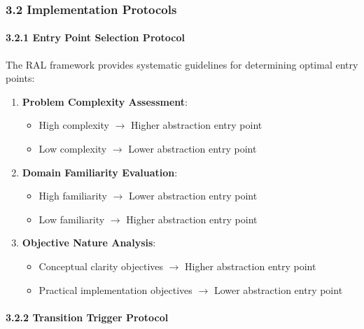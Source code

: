 \documentclass[
]{article}
\providecommand{\tightlist}{%
  \setlength{\itemsep}{0pt}\setlength{\parskip}{0pt}}
\begin{document}
\subsubsection{3.2 Implementation
Protocols}\label{implementation-protocols}

\paragraph{3.2.1 Entry Point Selection
Protocol}\label{entry-point-selection-protocol}

The RAL framework provides systematic guidelines for determining optimal
entry points:

\begin{enumerate}
\def\labelenumi{\arabic{enumi}.}
\tightlist
\item
  \textbf{Problem Complexity Assessment}:

  \begin{itemize}
  \tightlist
  \item
    High complexity \(\to \) Higher abstraction entry point
  \item
    Low complexity \(\to \) Lower abstraction entry point
  \end{itemize}
\item
  \textbf{Domain Familiarity Evaluation}:

  \begin{itemize}
  \tightlist
  \item
    High familiarity \(\to \) Lower abstraction entry point
  \item
    Low familiarity \(\to \) Higher abstraction entry point
  \end{itemize}
\item
  \textbf{Objective Nature Analysis}:

  \begin{itemize}
  \tightlist
  \item
    Conceptual clarity objectives \(\to \) Higher abstraction entry
    point
  \item
    Practical implementation objectives \(\to \) Lower abstraction entry
    point
  \end{itemize}
\end{enumerate}

\paragraph{3.2.2 Transition Trigger
Protocol}\label{transition-trigger-protocol}
\end{document}
